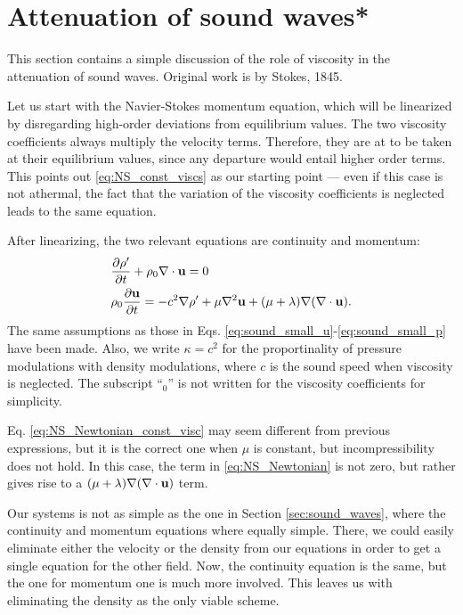 \section{Attenuation of sound waves*}
\label{sec:sound_waves_att}

This section contains a simple discussion of the role of viscosity in
the attenuation of sound waves. Original work is by Stokes, 1845.

Let us start with the Navier-Stokes momentum equation, which will be
linearized by disregarding high-order deviations from equilibrium
values. The two viscosity coefficients always multiply the velocity
terms. Therefore, they are at to be taken at their equilibrium values,
since any departure would entail higher order terms. This points out
\ref{eq:NS_const_viscs} as our starting point --- even if this case
is not athermal, the fact that the variation of the viscosity
coefficients is neglected leads to the same equation.


After linearizing, the two relevant equations are continuity and
momentum:
\begin{align}
  & \frac{\partial\rho' }{\partial t}  + \rho_0 \nabla\cdot\mathbf{u} =0 \\
  & \label{eq:NS_Newtonian_const_visc}
    \rho_0 \frac{\partial \mathbf{u} }{\partial t} =
    - c^2 \nabla \rho' + \mu \nabla^2 \mathbf{u}
    + ( \mu + \lambda ) \nabla ( \nabla\cdot\mathbf{u} ) .
\end{align}
The same assumptions as those in
Eqs. \ref{eq:sound_small_u}-\ref{eq:sound_small_p} have been made.
Also, we write $\kappa = c^2$ for the proportinality of pressure
modulations with density modulations, where $c$ is the sound speed
when viscosity is neglected. The subscript ``$_0$'' is not written for
the viscosity coefficients for simplicity.

Eq. \ref{eq:NS_Newtonian_const_visc} may seem different from previous
expressions, but it is the correct one when $\mu$ is constant, but
incompressibility does not hold. In this case, the term in
\ref{eq:NS_Newtonian} is not zero, but rather gives rise to a
$(\mu + \lambda) \nabla ( \nabla\cdot\mathbf{u} )$ term.

Our systems is not as simple as the one in Section
\ref{sec:sound_waves}, where the continuity and momentum equations
where equally simple. There, we could easily eliminate either the
velocity or the density from our equations in order to get a single
equation for the other field. Now, the continuity equation is the
same, but the one for momentum one is much more involved. This leaves
us with eliminating the density as the only viable scheme.

